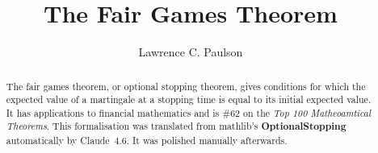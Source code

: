 \documentclass[11pt,a4paper]{article}
\begin{document}
\title{The Fair Games Theorem}
\author{Lawrence C. Paulson}
\maketitle

\begin{abstract}
The fair games theorem, or optional stopping theorem, gives conditions
for which the expected value of a martingale at a stopping time is equal 
to its initial expected value.
It has applications to financial mathematics 
and is \#62 on the \emph{Top 100 Matheoamtical Theorems}.
This formalisation was translated from mathlib's \textbf{OptionalStopping}
automatically by Claude~4.6. It was polished manually afterwards.
\end{abstract}

\tableofcontents

\newpage




\end{document}
